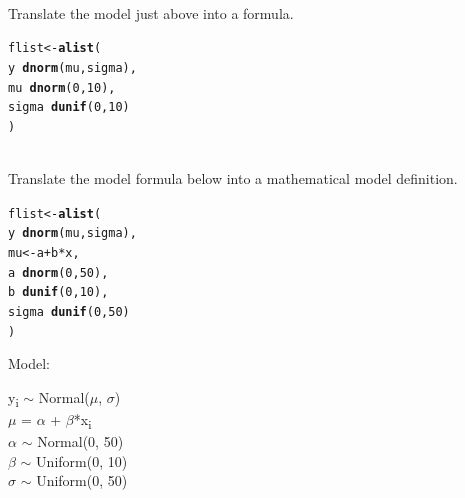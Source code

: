 \documentclass[12pt]{article}\usepackage[]{graphicx}\usepackage[]{color}
\makeatletter
\newcommand{\hlnum}[1]{\textcolor[rgb]{0.686,0.059,0.569}{#1}}%
\newcommand{\hlopt}[1]{\textcolor[rgb]{0,0,0}{#1}}%
\newcommand{\hlstd}[1]{\textcolor[rgb]{0.345,0.345,0.345}{#1}}%
\newcommand{\hlkwb}[1]{\textcolor[rgb]{0.69,0.353,0.396}{#1}}%
\newcommand{\hlkwd}[1]{\textcolor[rgb]{0.737,0.353,0.396}{\textbf{#1}}}%
\newenvironment{kframe}{%
 \def\at@end@of@kframe{}%
 \ifinner\ifhmode%
  \def\at@end@of@kframe{\end{minipage}}%
  \begin{minipage}{\columnwidth}%
 \fi\fi%
 \def\FrameCommand##1{\hskip\@totalleftmargin \hskip-\fboxsep
 \colorbox{shadecolor}{##1}\hskip-\fboxsep
     \hskip-\linewidth \hskip-\@totalleftmargin \hskip\columnwidth}%
 \MakeFramed {\advance\hsize-\width
   \@totalleftmargin\z@ \linewidth\hsize
   \@setminipage}}%
 {\par\unskip\endMakeFramed%
 \at@end@of@kframe}
\newenvironment{knitrout}{}{} %
\newenvironment{problem}[2][Problem]{\begin{trivlist}
\item[\hskip \labelsep {\bfseries #1}\hskip \labelsep {\bfseries #2.}]}{\end{trivlist}}
\makeatother
\begin{document}
\begin{problem}{4M2}
\text{}\\
Translate the model just above into a  formula.
\end{problem}

\begin{knitrout}
\color{fgcolor}\begin{kframe}
\begin{alltt}
\hlstd{flist} \hlkwb{<-} \hlkwd{alist}\hlstd{(}
  \hlstd{y} \hlopt{~} \hlkwd{dnorm}\hlstd{(mu, sigma),}
  \hlstd{mu} \hlopt{~} \hlkwd{dnorm}\hlstd{(}\hlnum{0}\hlstd{,} \hlnum{10}\hlstd{),}
  \hlstd{sigma} \hlopt{~} \hlkwd{dunif}\hlstd{(}\hlnum{0}\hlstd{,} \hlnum{10}\hlstd{)}
\hlstd{)}
\end{alltt}
\end{kframe}
\end{knitrout}

\begin{problem}{4M2}
\text{}\\
Translate the  model formula below into a mathematical model definition.

\begin{knitrout}
\color{fgcolor}\begin{kframe}
\begin{alltt}
\hlstd{flist} \hlkwb{<-} \hlkwd{alist}\hlstd{(}
  \hlstd{y} \hlopt{~} \hlkwd{dnorm}\hlstd{(mu, sigma),}
  \hlstd{mu} \hlkwb{<-} \hlstd{a} \hlopt{+}\hlstd{b}\hlopt{*}\hlstd{x,}
  \hlstd{a} \hlopt{~} \hlkwd{dnorm}\hlstd{(}\hlnum{0}\hlstd{,} \hlnum{50}\hlstd{),}
  \hlstd{b} \hlopt{~} \hlkwd{dunif}\hlstd{(}\hlnum{0}\hlstd{,} \hlnum{10}\hlstd{),}
  \hlstd{sigma} \hlopt{~} \hlkwd{dunif}\hlstd{(}\hlnum{0}\hlstd{,} \hlnum{50}\hlstd{)}
\hlstd{)}
\end{alltt}
\end{kframe}
\end{knitrout}
\end{problem}

Model:
\begin{center}
y\textsubscript{i} $\sim$ Normal($\mu$, $\sigma$)\\
$\mu$ = $\alpha$ + $\beta$*x\textsubscript{i}\\
$\alpha$ $\sim$ Normal(0, 50)\\
$\beta$ $\sim$ Uniform(0, 10)\\
$\sigma$ $\sim$ Uniform(0, 50)
\end{center}
\end{document}
